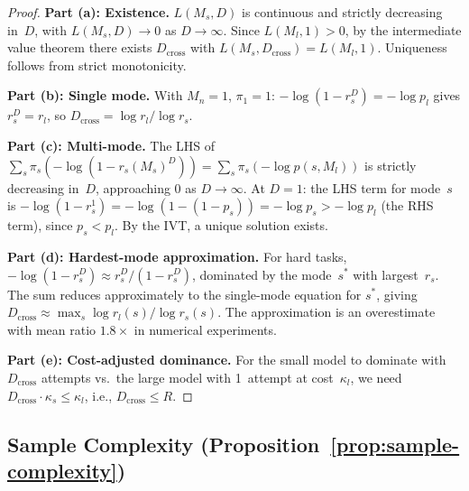 \documentclass[twoside,11pt]{article}
\newcommand{\Mn}{M_n}
\newcommand{\Dcross}{D_{\mathrm{cross}}}
\begin{document}
\begin{proof}
\noindent\textbf{Part (a): Existence.}
$L(M_s, D)$ is continuous and strictly decreasing in~$D$, with $L(M_s, D) \to 0$ as $D \to \infty$.
Since $L(M_l, 1) > 0$, by the intermediate value theorem there exists $\Dcross$ with $L(M_s, \Dcross) = L(M_l, 1)$.
Uniqueness follows from strict monotonicity.

\noindent\textbf{Part (b): Single mode.}
With $\Mn = 1$, $\pi_1 = 1$:
$-\log(1 - r_s^D) = -\log p_l$ gives $r_s^D = r_l$, so $\Dcross = \log r_l / \log r_s$.

\noindent\textbf{Part (c): Multi-mode.}
The LHS of $\sum_s \pi_s(-\log(1-r_s(M_s)^D)) = \sum_s \pi_s(-\log p(s,M_l))$ is strictly decreasing in~$D$, approaching $0$ as $D \to \infty$.
At $D = 1$: the LHS term for mode~$s$ is $-\log(1 - r_s^1) = -\log(1-(1-p_s)) = -\log p_s > -\log p_l$ (the RHS term), since $p_s < p_l$.
By the IVT, a unique solution exists.

\noindent\textbf{Part (d): Hardest-mode approximation.}
For hard tasks, $-\log(1-r_s^D) \approx r_s^D/(1-r_s^D)$, dominated by the mode~$s^*$ with largest~$r_s$.
The sum reduces approximately to the single-mode equation for $s^*$, giving $\Dcross \approx \max_s \log r_l(s)/\log r_s(s)$.
The approximation is an overestimate with mean ratio $1.8\times$ in numerical experiments.

\noindent\textbf{Part (e): Cost-adjusted dominance.}
For the small model to dominate with $\Dcross$ attempts vs.\ the large model with 1~attempt at cost~$\kappa_l$, we need $\Dcross \cdot \kappa_s \le \kappa_l$, i.e., $\Dcross \le R$.
\end{proof}

\subsection{Sample Complexity (Proposition~\ref{prop:sample-complexity})}
\label{app:sample-complexity}
\end{document}
